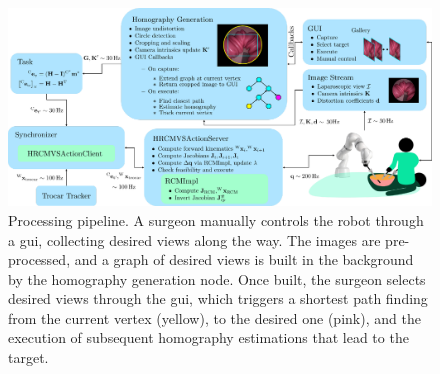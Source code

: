 \begin{figure}[tb]
\centering
\includegraphics[width=\textwidth]{img/h_rcm_vs_pipeline_real_view.pdf}
\caption{Processing pipeline. A surgeon manually controls the robot through a \acrfull{gui}, collecting desired views along the way. The images are pre-processed, and a graph of desired views is built in the background by the homography generation node. Once built, the surgeon selects desired views through the \acrshort{gui}, which triggers a shortest path finding from the current vertex (yellow), to the desired one (pink), and the execution of subsequent homography estimations that lead to the target.}
\label{c2:fig:pipe}
\end{figure}

